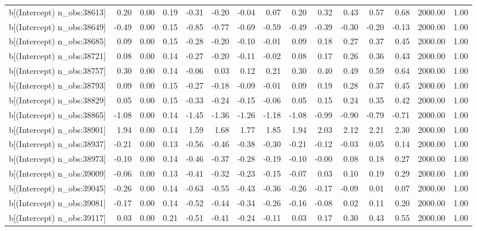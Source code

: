 \begin{table}[ht]
\begin{tabular}{rrrrrrrrrrrrrrr}
  b[(Intercept) n\_obs:38613] & 0.20 & 0.00 & 0.19 & -0.31 & -0.20 & -0.04 & 0.07 & 0.20 & 0.32 & 0.43 & 0.57 & 0.68 & 2000.00 & 1.00 \\ 
  b[(Intercept) n\_obs:38649] & -0.49 & 0.00 & 0.15 & -0.85 & -0.77 & -0.69 & -0.59 & -0.49 & -0.39 & -0.30 & -0.20 & -0.13 & 2000.00 & 1.00 \\ 
  b[(Intercept) n\_obs:38685] & 0.09 & 0.00 & 0.15 & -0.28 & -0.20 & -0.10 & -0.01 & 0.09 & 0.18 & 0.27 & 0.37 & 0.45 & 2000.00 & 1.00 \\ 
  b[(Intercept) n\_obs:38721] & 0.08 & 0.00 & 0.14 & -0.27 & -0.20 & -0.11 & -0.02 & 0.08 & 0.17 & 0.26 & 0.36 & 0.43 & 2000.00 & 1.00 \\ 
  b[(Intercept) n\_obs:38757] & 0.30 & 0.00 & 0.14 & -0.06 & 0.03 & 0.12 & 0.21 & 0.30 & 0.40 & 0.49 & 0.59 & 0.64 & 2000.00 & 1.00 \\ 
  b[(Intercept) n\_obs:38793] & 0.09 & 0.00 & 0.15 & -0.27 & -0.18 & -0.09 & -0.01 & 0.09 & 0.19 & 0.28 & 0.37 & 0.45 & 2000.00 & 1.00 \\ 
  b[(Intercept) n\_obs:38829] & 0.05 & 0.00 & 0.15 & -0.33 & -0.24 & -0.15 & -0.06 & 0.05 & 0.15 & 0.24 & 0.35 & 0.42 & 2000.00 & 1.00 \\ 
  b[(Intercept) n\_obs:38865] & -1.08 & 0.00 & 0.14 & -1.45 & -1.36 & -1.26 & -1.18 & -1.08 & -0.99 & -0.90 & -0.79 & -0.71 & 2000.00 & 1.00 \\ 
  b[(Intercept) n\_obs:38901] & 1.94 & 0.00 & 0.14 & 1.59 & 1.68 & 1.77 & 1.85 & 1.94 & 2.03 & 2.12 & 2.21 & 2.30 & 2000.00 & 1.00 \\ 
  b[(Intercept) n\_obs:38937] & -0.21 & 0.00 & 0.13 & -0.56 & -0.46 & -0.38 & -0.30 & -0.21 & -0.12 & -0.03 & 0.05 & 0.14 & 2000.00 & 1.00 \\ 
  b[(Intercept) n\_obs:38973] & -0.10 & 0.00 & 0.14 & -0.46 & -0.37 & -0.28 & -0.19 & -0.10 & -0.00 & 0.08 & 0.18 & 0.27 & 2000.00 & 1.00 \\ 
  b[(Intercept) n\_obs:39009] & -0.06 & 0.00 & 0.13 & -0.41 & -0.32 & -0.23 & -0.15 & -0.07 & 0.03 & 0.10 & 0.19 & 0.29 & 2000.00 & 1.00 \\ 
  b[(Intercept) n\_obs:39045] & -0.26 & 0.00 & 0.14 & -0.63 & -0.55 & -0.43 & -0.36 & -0.26 & -0.17 & -0.09 & 0.01 & 0.07 & 2000.00 & 1.00 \\ 
  b[(Intercept) n\_obs:39081] & -0.17 & 0.00 & 0.14 & -0.52 & -0.44 & -0.34 & -0.26 & -0.16 & -0.08 & 0.02 & 0.11 & 0.20 & 2000.00 & 1.00 \\ 
  b[(Intercept) n\_obs:39117] & 0.03 & 0.00 & 0.21 & -0.51 & -0.41 & -0.24 & -0.11 & 0.03 & 0.17 & 0.30 & 0.43 & 0.55 & 2000.00 & 1.00 \\ 

\end{tabular}
\end{table}
